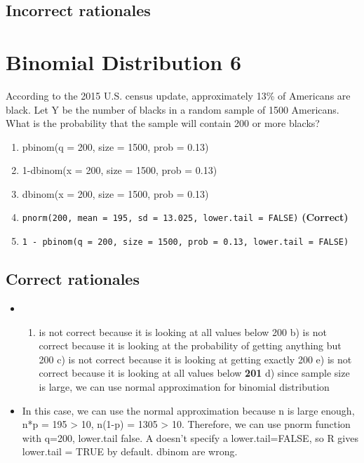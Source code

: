 \documentclass[letterpaper,9pt,twoside,printwatermark=false]{pinp}
\providecommand{\tightlist}{%
  \setlength{\itemsep}{0pt}\setlength{\parskip}{0pt}}
\begin{document}
\subsection{Incorrect rationales}\label{incorrect-rationales-4}

\section{Binomial Distribution 6}\label{binomial-distribution-6}

According to the 2015 U.S. census update, approximately 13\% of
Americans are black. Let Y be the number of blacks in a random sample of
1500 Americans. What is the probability that the sample will contain 200
or more blacks?

\begin{enumerate}
\def\labelenumi{\alph{enumi}.}
\tightlist
\item
  pbinom(q = 200, size = 1500, prob = 0.13)
\item
  1-dbinom(x = 200, size = 1500, prob = 0.13)
\item
  dbinom(x = 200, size = 1500, prob = 0.13)
\item
  \texttt{pnorm(200, mean = 195, sd = 13.025, lower.tail = FALSE)}
  \textbf{(Correct)}
\item
  \texttt{1 - pbinom(q = 200, size = 1500, prob = 0.13, lower.tail = FALSE)}
\end{enumerate}

\subsection{Correct rationales}\label{correct-rationales-5}

\begin{itemize}
\item
  \begin{enumerate}
  \def\labelenumi{\alph{enumi})}
  \tightlist
  \item
    is not correct because it is looking at all values below 200 b) is
    not correct because it is looking at the probability of getting
    anything but 200 c) is not correct because it is looking at getting
    exactly 200 e) is not correct because it is looking at all values
    below \textbf{201} d) since sample size is large, we can use normal
    approximation for binomial distribution
  \end{enumerate}
\item
  In this case, we can use the normal approximation because n is large
  enough, n*p = 195 \textgreater{} 10, n(1-p) = 1305 \textgreater{} 10.
  Therefore, we can use pnorm function with q=200, lower.tail false. A
  doesn't specify a lower.tail=FALSE, so R gives lower.tail = TRUE by
  default. dbinom are wrong.
\end{itemize}
\end{document}
